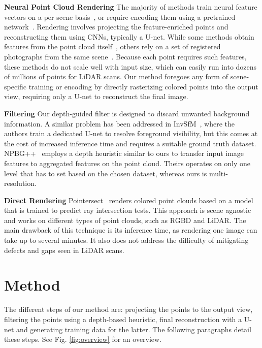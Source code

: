 \documentclass[twocolumn]{article}
\begin{document}
\textbf{Neural Point Cloud Rendering} The majority of methods train neural feature vectors on a per scene basis~\cite{hu2023trivolpointcloudrendering}, or require encoding them using a pretrained network~\cite{Rakhimov_2022_CVPR}. Rendering involves projecting the feature-enriched points and reconstructing them using CNNs, typically a U-net. While some methods obtain features from the point cloud itself~\cite{hu2023point2pixphotorealisticpointcloud}, others rely on a set of registered photographs from the same scene~\cite{npbg,franke2024trips,Rakhimov_2022_CVPR}. Because each point requires such features, these methods do not scale well with input size, which can easily run into dozens of millions of points for LiDAR scans. Our method foregoes any form of scene-specific training or encoding by directly rasterizing colored points into the output view, requiring only a U-net to reconstruct the final image.

\textbf{Filtering} Our depth-guided filter is designed to discard unwanted background information. A similar problem has been addressed in InvSfM~\cite{pittaluga2019revealing}, where the authors train a dedicated U-net to resolve foreground visibility, but this comes at the cost of increased inference time and requires a suitable ground truth dataset. NPBG++~\cite{Rakhimov_2022_CVPR} employs a depth heuristic similar to ours to transfer input image features to aggregated features on the point cloud. Theirs operates on only one level that has to set based on the chosen dataset, whereas ours is multi-resolution.

\textbf{Direct Rendering} Pointersect~\cite{pointersect} renders colored point clouds based on a model that is trained to predict ray intersection tests. This approach is scene agnostic and works on different types of point clouds, such as RGBD and LiDAR. The main drawback of this technique is its inference time, as rendering one image can take up to several minutes. It also does not address the difficulty of mitigating defects and gaps seen in LiDAR scans.

\section{Method}
The different steps of our method are: projecting the points to the output view, filtering the points using a depth-based heuristic, final reconstruction with a U-net and generating training data for the latter. The following paragraphs detail these steps. See Fig. \ref{fig:overview} for an overview.
\end{document}

